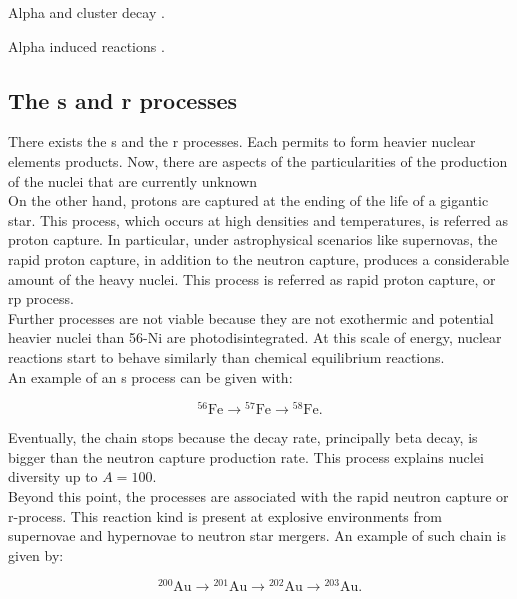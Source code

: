 \documentclass[openany]{book}
\begin{document}
Alpha and cluster decay \cite{maroufi_dehghani_alavi_2019}.

Alpha induced reactions \cite{le_duy_hung_2021}.


\subsection{The s and r processes} \label{sub:srProcesses}

There exists the s and  the r processes. Each permits to form heavier nuclear elements products. Now, there are aspects of the particularities of the production of the nuclei that  are currently  unknown \\

On the other hand, protons are captured at the ending of the life of a gigantic star. This process, which occurs at high densities and temperatures, is referred as proton capture. In particular, under astrophysical scenarios like supernovas, the rapid proton capture, in addition to the neutron capture,  produces a considerable amount of the heavy nuclei. This process is referred as rapid proton capture, or rp process. \\ 

Further processes are not viable because they are not exothermic and potential heavier nuclei than 56-Ni are photodisintegrated. At this scale of energy, nuclear reactions start to behave similarly than chemical equilibrium reactions. \\ 

An example of an s process can be given with:

\begin{equation}\label{eq:reactions_sProcess}
	\mathrm{{}^{56}Fe \rightarrow {}^{57}Fe \rightarrow  {}^{58}Fe }.
\end{equation}

Eventually, the chain stops because the decay rate, principally beta decay, is bigger than the neutron capture production rate. This process explains nuclei diversity up to $A = 100$. \\

Beyond this point, the processes are associated with the rapid neutron capture or r-process. This reaction kind is present at explosive environments from supernovae and hypernovae to neutron star mergers. An example of such chain is given by: 

\begin{equation}\label{eq:reactions_rProcess}
	\mathrm{{}^{200}Au \rightarrow {}^{201}Au \rightarrow  {}^{202}Au \rightarrow  {}^{203}Au}.
\end{equation}
\end{document}
